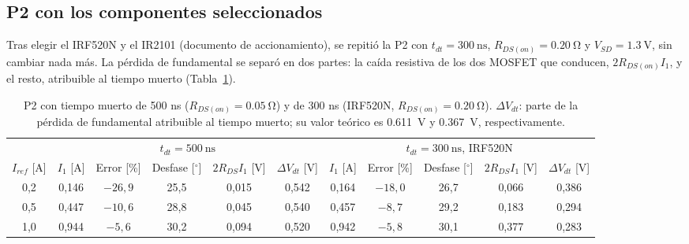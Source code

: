 \documentclass[10pt,twocolumn,letterpaper]{article}
\begin{document}
\subsection{P2 con los componentes seleccionados}\label{sec:p2b}
Tras elegir el IRF520N y el IR2101 (documento de accionamiento), se repitió la P2 con $t_{dt}=\SI{300}{\nano\second}$, $R_{DS(on)}=\SI{0,20}{\ohm}$ y $V_{SD}=\SI{1,3}{\volt}$, sin cambiar nada más. La pérdida de fundamental se separó en dos partes: la caída resistiva de los dos MOSFET que conducen, $2R_{DS(on)}I_1$, y el resto, atribuible al tiempo muerto (Tabla~\ref{tab:p2b}).

\begin{table}[!t]
\centering
\caption{P2 con tiempo muerto de 500 ns ($R_{DS(on)}=\SI{0,05}{\ohm}$) y de 300 ns (IRF520N, $R_{DS(on)}=\SI{0,20}{\ohm}$). $\Delta V_{dt}$: parte de la pérdida de fundamental atribuible al tiempo muerto; su valor teórico es \SI{0,611}{\volt} y \SI{0,367}{\volt}, respectivamente.}
\label{tab:p2b}
\footnotesize
\setlength{\tabcolsep}{4pt}
\begin{tabular}{@{}c|ccccc|ccccc@{}}
\toprule
 & \multicolumn{5}{c|}{$t_{dt}=\SI{500}{\nano\second}$} & \multicolumn{5}{c}{$t_{dt}=\SI{300}{\nano\second}$, IRF520N} \\
$I_{ref}$ [A] & $I_1$ [A] & Error [\%] & Desfase [$^\circ$] & $2R_{DS}I_1$ [V] & $\Delta V_{dt}$ [V] & $I_1$ [A] & Error [\%] & Desfase [$^\circ$] & $2R_{DS}I_1$ [V] & $\Delta V_{dt}$ [V] \\
\midrule
0,2 & 0,146 & $-26{,}9$ & 25,5 & 0,015 & 0,542 & 0,164 & $-18{,}0$ & 26,7 & 0,066 & 0,386 \\
0,5 & 0,447 & $-10{,}6$ & 28,8 & 0,045 & 0,540 & 0,457 & $-8{,}7$ & 29,2 & 0,183 & 0,294 \\
1,0 & 0,944 & $-5{,}6$ & 30,2 & 0,094 & 0,520 & 0,942 & $-5{,}8$ & 30,1 & 0,377 & 0,283 \\
\bottomrule
\end{tabular}
\end{table}
\end{document}
